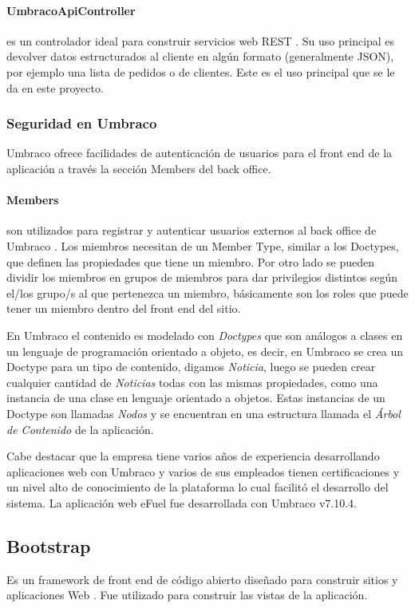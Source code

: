     \paragraph{UmbracoApiController} es un controlador ideal para construir servicios web REST \cite{apiController}. Su uso principal es devolver datos estructurados al cliente en algún formato (generalmente JSON), por ejemplo una lista de pedidos o de clientes. Este es el uso principal que se le da en este proyecto.

    \subsubsection{Seguridad en Umbraco}
    Umbraco ofrece facilidades de autenticación de usuarios para el front end de la aplicación a través la sección Members del back office.
    \paragraph{Members} son utilizados para registrar y autenticar usuarios externos al back office de Umbraco \cite{membersUmbraco}. Los miembros necesitan de un Member Type, similar a los Doctypes, que definen las propiedades que tiene un miembro. Por otro lado se pueden dividir los miembros en grupos de miembros para dar privilegios distintos según el/los grupo/s al que pertenezca un miembro, básicamente son los roles que puede tener un miembro dentro del front end del sitio.

    En Umbraco el contenido es modelado con \emph{Doctypes} que son análogos a clases en un lenguaje de programación orientado a objeto, es decir, en Umbraco se crea un Doctype para un tipo de contenido, digamos \emph{Noticia}, luego se pueden crear cualquier cantidad de \emph{Noticias} todas con las mismas propiedades, como una instancia de una clase en lenguaje orientado a objetos. Estas instancias de un Doctype son llamadas \emph{Nodos} y se encuentran en una estructura llamada el \emph{Árbol de Contenido} de la aplicación.

    Cabe destacar que la empresa tiene varios años de experiencia desarrollando aplicaciones web con Umbraco y varios de sus empleados tienen certificaciones y un nivel alto de conocimiento de la plataforma lo cual facilitó el desarrollo del sistema. La aplicación web eFuel fue desarrollada con Umbraco v7.10.4.

    \subsection{Bootstrap}
    Es un framework de front end de código abierto diseñado para construir sitios y aplicaciones Web \cite{bootstrapAbout}. Fue utilizado para construir las vistas de la aplicación.

